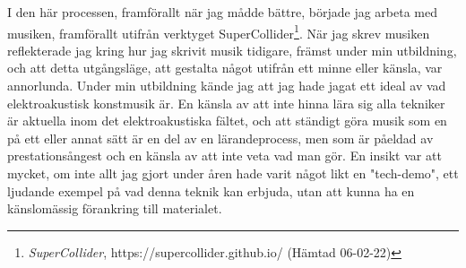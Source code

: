 \documentclass{article}
\begin{document}
I den här processen, framförallt när jag mådde bättre, började jag arbeta med musiken, framförallt utifrån
verktyget SuperCollider\footnote{\emph{SuperCollider}, https://supercollider.github.io/ (Hämtad 06-02-22)}.
När jag skrev musiken reflekterade jag kring hur jag skrivit musik tidigare, främst under min utbildning, och
att detta utgångsläge, att gestalta något utifrån ett minne eller känsla, var annorlunda. Under min utbildning
kände jag att jag hade jagat ett ideal av vad elektroakustisk konstmusik är. En känsla av att inte hinna lära
sig alla tekniker är aktuella inom det elektroakustiska fältet, och att ständigt göra musik som en på ett
eller annat sätt är en del av en lärandeprocess, men som är påeldad av prestationsångest och en känsla av att
inte veta vad man gör. En insikt var att mycket, om inte allt jag gjort under åren hade varit något likt en
"tech-demo", ett ljudande exempel på vad denna teknik kan erbjuda, utan att kunna ha en känslomässig
förankring till materialet. 





\end{document}
